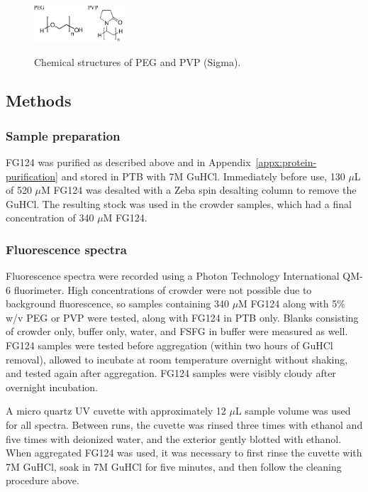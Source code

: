 \begin{figure}
\caption[Chemical structures of PEG and PVP.]{Chemical structures of PEG and PVP (Sigma).}
\centering
\includegraphics[width=0.3\textwidth]{figs/ch05/peg-pvp-structure.pdf}
\label{fig:peg-pvp-struct}
\end{figure}

\subsection{Methods}

\subsubsection{Sample preparation}
FG124 was purified as described above and in Appendix~\ref{appx:protein-purification} and stored in PTB with 7M GuHCl.  Immediately before use, 130 $\mu$L of 520 $\mu$M FG124 was desalted with a Zeba spin desalting column to remove the GuHCl.  The resulting stock was used in the crowder samples, which had a final concentration of 340 $\mu$M FG124. 

\subsubsection{Fluorescence spectra}
Fluorescence spectra were recorded using a Photon Technology International QM-6 fluorimeter.  High concentrations of crowder were not possible due to background fluorescence, so samples containing 340 $\mu$M FG124 along with 5\% w/v PEG or PVP were tested, along with FG124 in PTB only.  Blanks consisting of crowder only, buffer only, water, and FSFG in buffer were measured as well.  FG124 samples were tested before aggregation (within two hours of GuHCl removal), allowed to incubate at room temperature overnight without shaking, and tested again after aggregation.  FG124 samples were visibly cloudy after overnight incubation.

A micro quartz UV cuvette with approximately 12 $\mu$L sample volume was used for all spectra.  Between runs, the cuvette was rinsed three times with ethanol and five times with deionized water, and the exterior gently blotted with ethanol.  When aggregated FG124 was used, it was necessary to first rinse the cuvette with 7M GuHCl, soak in 7M GuHCl for five minutes, and then follow the cleaning procedure above.

